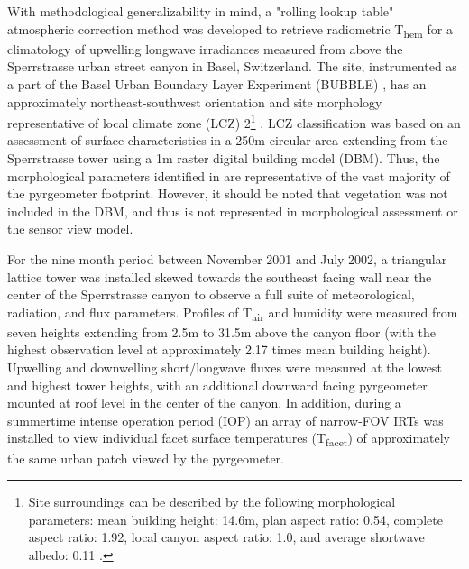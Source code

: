 With methodological generalizability in mind, a "rolling lookup table" atmospheric correction method was developed to retrieve radiometric T\textsubscript{hem} for a climatology of upwelling longwave irradiances measured from above the Sperrstrasse urban street canyon in Basel, Switzerland. The site, instrumented as a part of the Basel Urban Boundary Layer Experiment (BUBBLE) \cite{Rotach2005}, has an approximately northeast-southwest orientation and site morphology representative of local climate zone (LCZ) 2\footnote{Site surroundings can be described by the following morphological parameters: mean building height: 14.6m, plan aspect ratio: 0.54, complete aspect ratio: 1.92, local canyon aspect ratio: 1.0, and average shortwave albedo: 0.11 \cite{Rotach2005}.} \cite{Stewart2012}. LCZ classification was based on an assessment of surface characteristics in a 250m circular area extending from the Sperrstrasse tower using a 1m raster digital building model (DBM). Thus, the morphological parameters identified in \cite{Rotach2005} are representative of the vast majority of the pyrgeometer footprint. However, it should be noted that vegetation was not included in the DBM, and thus is not represented in morphological assessment or the sensor view model. 

For the nine month period between November 2001 and July 2002, a triangular lattice tower was installed skewed towards the southeast facing wall near the center of the Sperrstrasse canyon to observe a full suite of meteorological, radiation, and flux parameters. Profiles of T\textsubscript{air} and humidity were measured from seven heights extending from 2.5m to 31.5m above the canyon floor (with the highest observation level at approximately 2.17 times mean building height). Upwelling and downwelling short/longwave fluxes were measured at the lowest and highest tower heights, with an additional downward facing pyrgeometer mounted at roof level in the center of the canyon. In addition, during a summertime intense operation period (IOP) an array of narrow-FOV IRTs was installed to view individual facet surface temperatures (T\textsubscript{facet}) of approximately the same urban patch viewed by the pyrgeometer. 

